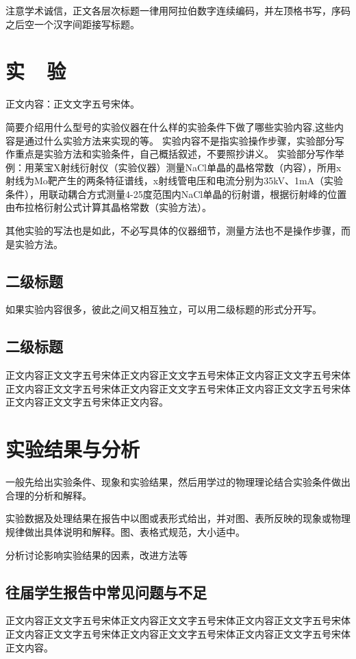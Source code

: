 \documentclass{thuemp}
\begin{document}
注意学术诚信，正文各层次标题一律用阿拉伯数字连续编码，并左顶格书写，序码之后空一个汉字间距接写标题。


\section{实~~验}
正文内容：正文文字五号宋体。

简要介绍用什么型号的实验仪器在什么样的实验条件下做了哪些实验内容,这些内容是通过什么实验方法来实现的等。
实验内容不是指实验操作步骤，实验部分写作重点是实验方法和实验条件，自己概括叙述，不要照抄讲义。
实验部分写作举例：用莱宝X射线衍射仪（实验仪器）测量NaCl单晶的晶格常数（内容），所用x射线为Mo靶产生的两条特征谱线，x射线管电压和电流分别为35kV、1mA（实验条件），用联动耦合方式测量4-25度范围内NaCl单晶的衍射谱，根据衍射峰的位置由布拉格衍射公式计算其晶格常数（实验方法）。


其他实验的写法也是如此，不必写具体的仪器细节，测量方法也不是操作步骤，而是实验方法。

\subsection{二级标题}
如果实验内容很多，彼此之间又相互独立，可以用二级标题的形式分开写。

\subsection{二级标题}
正文内容正文文字五号宋体正文内容正文文字五号宋体正文内容正文文字五号宋体正文内容正文文字五号宋体正文内容正文文字五号宋体正文内容正文文字五号宋体正文内容正文文字五号宋体正文内容。

\section{实验结果与分析}
一般先给出实验条件、现象和实验结果，然后用学过的物理理论结合实验条件做出合理的分析和解释。

实验数据及处理结果在报告中以图或表形式给出，并对图、表所反映的现象或物理规律做出具体说明和解释。图、表格式规范，大小适中。

分析讨论影响实验结果的因素，改进方法等

\subsection{往届学生报告中常见问题与不足}
正文内容正文文字五号宋体正文内容正文文字五号宋体正文内容正文文字五号宋体正文内容正文文字五号宋体正文内容正文文字五号宋体正文内容正文文字五号宋体正文内容。
\end{document}
